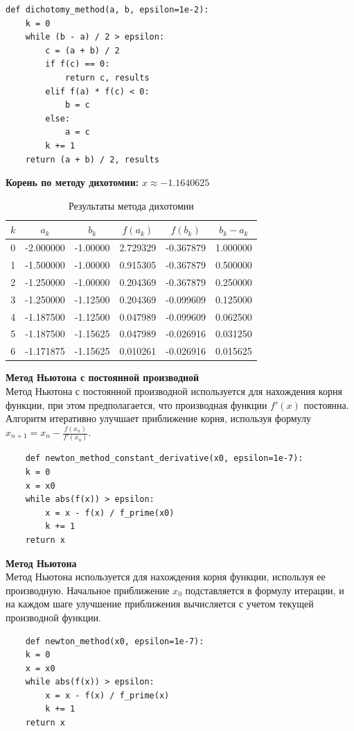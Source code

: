 \documentclass[a4paper, 12pt]{report}
\begin{document}
\begin{verbatim}
def dichotomy_method(a, b, epsilon=1e-2):
    k = 0
    while (b - a) / 2 > epsilon:
        c = (a + b) / 2
        if f(c) == 0:
            return c, results
        elif f(a) * f(c) < 0:
            b = c
        else:
            a = c
        k += 1
    return (a + b) / 2, results
\end{verbatim}

\textbf{Корень по методу дихотомии:} $x \approx -1.1640625$
\begin{table}[h]
    \centering
    \begin{tabular}{cccccc}
        \toprule
        $k$ & $a_k$ & $b_k$ & $f(a_k)$ & $f(b_k)$ & $b_k - a_k$ \\
        \midrule
        0 & -2.000000 & -1.00000 & 2.729329 & -0.367879 & 1.000000 \\
        1 & -1.500000 & -1.00000 & 0.915305 & -0.367879 & 0.500000 \\
        2 & -1.250000 & -1.00000 & 0.204369 & -0.367879 & 0.250000 \\
        3 & -1.250000 & -1.12500 & 0.204369 & -0.099609 & 0.125000 \\
        4 & -1.187500 & -1.12500 & 0.047989 & -0.099609 & 0.062500 \\
        5 & -1.187500 & -1.15625 & 0.047989 & -0.026916 & 0.031250 \\
        6 & -1.171875 & -1.15625 & 0.010261 & -0.026916 & 0.015625 \\
        \bottomrule
    \end{tabular}
    \caption{Результаты метода дихотомии}
\end{table}

\textbf{Метод Ньютона с постоянной производной}\\
Метод Ньютона с постоянной производной используется для нахождения корня функции, при этом предполагается, что производная функции \( f'(x) \) постоянна. Алгоритм итеративно улучшает приближение корня, используя формулу \( x_{n+1} = x_n - \frac{f(x_n)}{f'(x_n)} \).
\begin{verbatim}
    def newton_method_constant_derivative(x0, epsilon=1e-7):
    k = 0
    x = x0
    while abs(f(x)) > epsilon:
        x = x - f(x) / f_prime(x0)
        k += 1
    return x
\end{verbatim}

\textbf{Метод Ньютона}\\
Метод Ньютона используется для нахождения корня функции, используя ее производную. Начальное приближение \(x_0\) подставляется в формулу итерации, и на каждом шаге улучшение приближения вычисляется с учетом текущей производной функции.
\begin{verbatim}
    def newton_method(x0, epsilon=1e-7):
    k = 0
    x = x0
    while abs(f(x)) > epsilon:
        x = x - f(x) / f_prime(x)
        k += 1
    return x
\end{verbatim}
\end{document}
